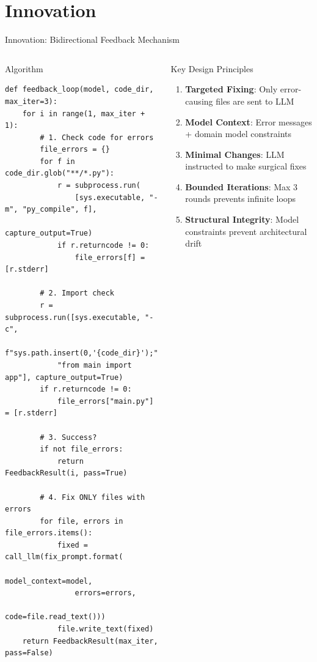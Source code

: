 \documentclass[10pt,aspectratio=169]{beamer}
\begin{document}
\section{Innovation}
\begin{frame}[fragile]{Innovation: Bidirectional Feedback Mechanism}
\vspace{-8pt}

\begin{columns}[T]
\begin{block}{Algorithm}
\tiny
\begin{lstlisting}[style=smallcode]
def feedback_loop(model, code_dir, max_iter=3):
    for i in range(1, max_iter + 1):
        # 1. Check code for errors
        file_errors = {}
        for f in code_dir.glob("**/*.py"):
            r = subprocess.run(
                [sys.executable, "-m", "py_compile", f],
                capture_output=True)
            if r.returncode != 0:
                file_errors[f] = [r.stderr]

        # 2. Import check
        r = subprocess.run([sys.executable, "-c",
            f"sys.path.insert(0,'{code_dir}');"
            "from main import app"], capture_output=True)
        if r.returncode != 0:
            file_errors["main.py"] = [r.stderr]

        # 3. Success?
        if not file_errors:
            return FeedbackResult(i, pass=True)

        # 4. Fix ONLY files with errors
        for file, errors in file_errors.items():
            fixed = call_llm(fix_prompt.format(
                model_context=model,
                errors=errors,
                code=file.read_text()))
            file.write_text(fixed)
    return FeedbackResult(max_iter, pass=False)
\end{lstlisting}
\end{block}

\begin{block}{Key Design Principles}
\begin{enumerate}
    \item \textbf{Targeted Fixing}: Only error-causing files are sent to LLM
    \item \textbf{Model Context}: Error messages + domain model constraints
    \item \textbf{Minimal Changes}: LLM instructed to make surgical fixes
    \item \textbf{Bounded Iterations}: Max 3 rounds prevents infinite loops
    \item \textbf{Structural Integrity}: Model constraints prevent architectural drift
\end{enumerate}
\end{block}


\end{columns}
\end{frame}
\end{document}
